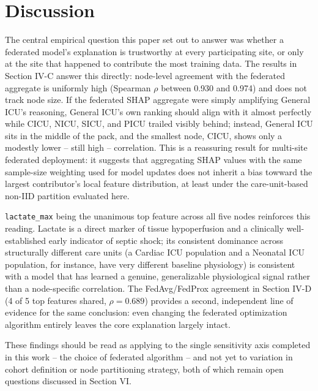 \documentclass[conference]{IEEEtran}
\begin{document}
\section{Discussion}

The central empirical question this paper set out to answer was whether a
federated model's explanation is trustworthy at every participating site,
or only at the site that happened to contribute the most training data.
The results in Section IV-C answer this directly: node-level agreement with
the federated aggregate is uniformly high (Spearman $\rho$ between 0.930
and 0.974) and does not track node size. If the federated SHAP aggregate
were simply amplifying General ICU's reasoning, General ICU's own ranking
should align with it almost perfectly while CICU, NICU, SICU, and PICU
trailed visibly behind; instead, General ICU sits in the middle of the
pack, and the smallest node, CICU, shows only a modestly lower -- still
high -- correlation. This is a reassuring result for multi-site federated
deployment: it suggests that aggregating SHAP values with the same
sample-size weighting used for model updates does not inherit a bias
towward the largest contributor's local feature distribution, at least
under the care-unit-based non-IID partition evaluated here.

\texttt{lactate\_max} being the unanimous top feature across all five
nodes reinforces this reading. Lactate is a direct marker of tissue
hypoperfusion and a clinically well-established early indicator of septic
shock; its consistent dominance across structurally different care units
(a Cardiac ICU population and a Neonatal ICU population, for instance, have
very different baseline physiology) is consistent with a model that has
learned a genuine, generalizable physiological signal rather than a
node-specific correlation. The FedAvg/FedProx agreement in Section IV-D
(4 of 5 top features shared, $\rho = 0.689$) provides a second, independent
line of evidence for the same conclusion: even changing the federated
optimization algorithm entirely leaves the core explanation largely intact.

These findings should be read as applying to the single sensitivity axis
completed in this work -- the choice of federated algorithm -- and not yet
to variation in cohort definition or node partitioning strategy, both of
which remain open questions discussed in Section VI.
\end{document}
